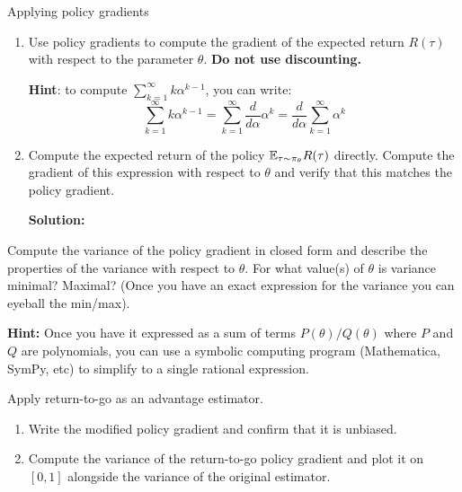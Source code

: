 \documentclass{article}
\begin{document}
\begin{enumerate}
 Applying policy gradients
\begin{enumerate}
    \item Use policy gradients to compute the gradient of the expected return $R(\tau)$ with respect to the parameter $\theta$. \textbf{Do not use discounting.}

    \textbf{Hint}: to compute $\sum_{k=1}^\infty k\alpha^{k-1}$, you can write:
    \[\sum_{k=1}^\infty k\alpha^{k-1} = \sum_{k=1}^\infty \frac{d}{d\alpha}\alpha^k = \frac{d}{d\alpha}\sum_{k=1}^\infty\alpha^k\]

    \begin{sol}
    \end{sol}

    \item \label{exact_gradient} Compute the expected return of the policy $\mathbb{E}_{\tau \sim \pi_\theta} R(\tau)$ directly. Compute the gradient of this expression with respect to $\theta$ and verify that this matches the policy gradient.

\textbf{Solution:}

\end{enumerate}
\newpage
{} Compute the variance of the policy gradient in closed form and describe the properties of the variance with respect to $\theta$. For what value(s) of $\theta$ is variance minimal? Maximal? (Once you have an exact expression for the variance you can eyeball the min/max).

\textbf{Hint:}  Once you have it expressed as a sum of terms $P(\theta)/Q(\theta)$ where $P$ and $Q$ are polynomials, you can use a symbolic computing program (Mathematica, SymPy, etc) to simplify to a single rational expression.

\begin{sol}
\end{sol}

\newpage
{} Apply return-to-go as an advantage estimator.
\begin{enumerate}
    \item Write the modified policy gradient and confirm that it is unbiased.

    \begin{sol}
    \end{sol}

    \item Compute the variance of the return-to-go policy gradient and plot it on $[0, 1]$ alongside the variance of the original estimator.


\end{enumerate}
\end{enumerate}
\end{document}
